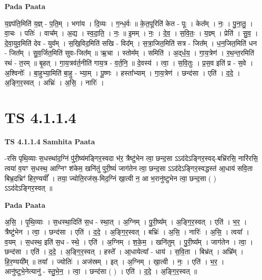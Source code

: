 \documentclass[17pt]{extarticle}
\begin{document}
\textbf{Pada Paata} \newline

य॒ज्ञ्प॑ति॒मिति॑ य॒ज्ञ् - प॒ति॒म् । भगा॑य । दि॒व्यः । ग॒न्ध॒र्वः ॥ के॒त॒पूरिति॑ केत - पूः । केत᳚म् । नः॒ । पु॒ना॒तु॒ । वा॒चः । पतिः॑ । वाच᳚म् । अ॒द्य । स्व॒दा॒ति॒ । नः॒ ॥ इ॒मम् । नः॒ । दे॒व॒ । स॒वि॒तः॒ । य॒ज्ञ्म् । प्रेति॑ । सु॒व॒ । दे॒वा॒युव॒मिति॑ देव - युव᳚म् । स॒खि॒विद॒मिति॑ सखि - विद᳚म् । स॒त्रा॒जित॒मिति॑ सत्र - जित᳚म् । ध॒न॒जित॒मिति॑ धन - जित᳚म् । सु॒व॒र्जित॒मिति॑ सुवः-जित᳚म् ॥ ऋ॒चा । स्तोम᳚म् । समिति॑ । अ॒द्‌र्ध॒य॒ । गा॒य॒त्रेण॑ । र॒थ॒न्त॒रमिति॑ रथं - त॒रम् ॥ बृ॒हत् । गा॒य॒त्रव॑र्त॒नीति॑ गाय॒त्र - व॒र्त॒नि॒ ॥ दे॒वस्य॑ । त्वा॒ । स॒वि॒तुः । प्र॒स॒व इति॑ प्र - स॒वे । अ॒श्विनोः᳚ । बा॒हुभ्या॒मिति॑ बा॒हु - भ्या॒म् । पू॒ष्णः । हस्ता᳚भ्याम् । गा॒य॒त्रेण॑ । छन्द॑सा । एति॑ । द॒दे॒ । अ॒ङ्गि॒र॒स्वत् । अभ्रिः॑ । अ॒सि॒ । नारिः॑ ।  \newline





\section{ TS 4.1.1.4 }

\textbf{TS 4.1.1.4 } \newline
\textbf{Samhita Paata} \newline

-रसि पृथि॒व्याः स॒धस्था॑द॒ग्निं पु॑री॒ष्य॑मङ्गिर॒स्वदा भ॑र॒ त्रैष्टु॑भेन त्वा॒ छन्द॒सा ऽऽद॑देऽङ्गिर॒स्वद्-बभ्रि॑रसि॒ नारि॑रसि॒ त्वया॑ व॒यꣳ स॒धस्थ॒ आग्निꣳ श॑केम॒ खनि॑तुं पुरी॒ष्यं॑ जाग॑तेन त्वा॒ छन्द॒सा ऽऽद॑देऽङ्गिर॒स्वद्धस्त॑ आ॒धाय॑ सवि॒ता बिभ्र॒दभ्रिꣳ॑ हिर॒ण्ययीं᳚ । तया॒ ज्योति॒रज॑स्र॒-मिद॒ग्निं खा॒त्वी न॒ आ भ॒रानु॑ष्टुभेन त्वा॒ छन्द॒सा ( ) ऽऽद॑देऽङ्गिर॒स्वत् ॥ \newline

\textbf{Pada Paata} \newline

अ॒सि॒ । पृ॒थि॒व्याः । स॒धस्था॒दिति॑ स॒ध - स्था॒त् । अ॒ग्निम् । पु॒री॒ष्य᳚म् । अ॒ङ्गि॒र॒स्वत् । एति॑ । भ॒र॒ । त्रैष्टु॑भेन । त्वा॒ । छन्द॑सा । एति॑ । द॒दे॒ । अ॒ङ्गि॒र॒स्वत् । बभ्रिः॑ । अ॒सि॒ । नारिः॑ । अ॒सि॒ । त्वया᳚ । व॒यम् । स॒धस्थ॒ इति॑ स॒ध - स्थे॒ । एति॑ । अ॒ग्निम् । श॒के॒म॒ । खनि॑तुम् । पु॒री॒ष्य᳚म् । जाग॑तेन । त्वा॒ । छन्द॑सा । एति॑ । द॒दे॒ । अ॒ङ्गि॒र॒स्वत् । हस्ते᳚ । आ॒धायेत्या᳚ - धाय॑ । स॒वि॒ता । बिभ्र॑त् । अभ्रि᳚म् । हि॒र॒ण्ययी᳚म् ॥ तया᳚ । ज्योतिः॑ । अज॑स्रम् । इत् । अ॒ग्निम् । खा॒त्वी । नः॒ । एति॑ । भ॒र॒ । आनु॑ष्टुभे॒नेत्यानु॑ - स्तु॒भे॒न॒ । त्वा॒ । छन्द॑सा ( ) । एति॑ । द॒दे॒ । अ॒ङ्गि॒र॒स्वत् ॥  \newline
\end{document}

